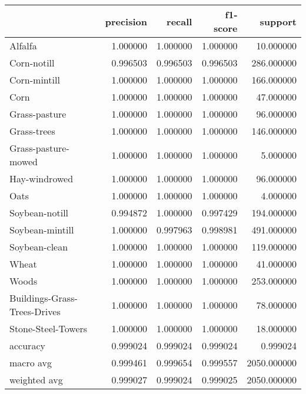 \begin{tabular}{lrrrr}
\toprule
{} &  precision &    recall &  f1-score &      support \\
\midrule
Alfalfa                      &   1.000000 &  1.000000 &  1.000000 &    10.000000 \\
Corn-notill                  &   0.996503 &  0.996503 &  0.996503 &   286.000000 \\
Corn-mintill                 &   1.000000 &  1.000000 &  1.000000 &   166.000000 \\
Corn                         &   1.000000 &  1.000000 &  1.000000 &    47.000000 \\
Grass-pasture                &   1.000000 &  1.000000 &  1.000000 &    96.000000 \\
Grass-trees                  &   1.000000 &  1.000000 &  1.000000 &   146.000000 \\
Grass-pasture-mowed          &   1.000000 &  1.000000 &  1.000000 &     5.000000 \\
Hay-windrowed                &   1.000000 &  1.000000 &  1.000000 &    96.000000 \\
Oats                         &   1.000000 &  1.000000 &  1.000000 &     4.000000 \\
Soybean-notill               &   0.994872 &  1.000000 &  0.997429 &   194.000000 \\
Soybean-mintill              &   1.000000 &  0.997963 &  0.998981 &   491.000000 \\
Soybean-clean                &   1.000000 &  1.000000 &  1.000000 &   119.000000 \\
Wheat                        &   1.000000 &  1.000000 &  1.000000 &    41.000000 \\
Woods                        &   1.000000 &  1.000000 &  1.000000 &   253.000000 \\
Buildings-Grass-Trees-Drives &   1.000000 &  1.000000 &  1.000000 &    78.000000 \\
Stone-Steel-Towers           &   1.000000 &  1.000000 &  1.000000 &    18.000000 \\
accuracy                     &   0.999024 &  0.999024 &  0.999024 &     0.999024 \\
macro avg                    &   0.999461 &  0.999654 &  0.999557 &  2050.000000 \\
weighted avg                 &   0.999027 &  0.999024 &  0.999025 &  2050.000000 \\
\bottomrule
\end{tabular}
